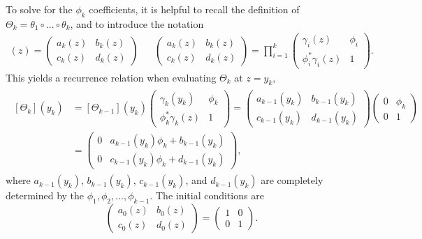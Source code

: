 To solve for the $\phi_k$ coefficients, it is helpful to recall the definition of $\Theta_k = \theta_1\circ ... \circ\theta_k$, and to introduce the notation
\begin{align}
    [\Theta_k](z) = \begin{pmatrix} a_k(z) & b_k(z) \\ c_k(z) & d_k(z) \end{pmatrix} && 
    \begin{pmatrix} a_k(z) & b_k(z) \\ c_k(z) & d_k(z) \end{pmatrix} = 
    \prod_{i = 1}^{k} \begin{pmatrix} \gamma_i(z) & \phi_i \\ \phi_i^*\gamma_i(z) & 1 \end{pmatrix}.
\end{align}
This yields a recurrence relation when evaluating $\Theta_k$ at $z = y_k$,
\begin{align} \begin{split}
    [\Theta_k](y_k) &= [\Theta_{k-1}](y_k) \begin{pmatrix} \gamma_k(y_k) & \phi_k \\ \phi_k^*\gamma_k(z) & 1 \end{pmatrix} = \begin{pmatrix}
        a_{k-1}(y_k) & b_{k-1}(y_k) \\ 
        c_{k-1}(y_k) & d_{k-1}(y_k)
    \end{pmatrix}
    \begin{pmatrix}
        0 & \phi_k \\
        0 & 1
    \end{pmatrix} \\
    &= \begin{pmatrix}
        0 & a_{k-1}(y_k) \phi_k + b_{k-1}(y_k) \\
        0 & c_{k-1}(y_k) \phi_k + d_{k-1}(y_k)
    \end{pmatrix},
    \label{eq:theta_expansion}
\end{split} \end{align}
where $a_{k-1}(y_k)$, $b_{k-1}(y_k)$, $c_{k-1}(y_k)$, and $d_{k-1}(y_k)$ are completely determined by the $\phi_1, \phi_2, ..., \phi_{k - 1}$. The initial conditions are
\begin{equation}
    \begin{pmatrix}
        a_0(z) & b_0(z) \\ c_0(z) & d_0(z)
    \end{pmatrix} = \begin{pmatrix}
        1 & 0 \\ 0 & 1
    \end{pmatrix}.
\end{equation}
